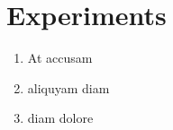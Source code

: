 \section{Experiments}
\label{sec:experiments}



\begin{enumerate} \label{example:enumeration}
	\item At accusam
	\item aliquyam diam
	\item diam dolore
\end{enumerate}


